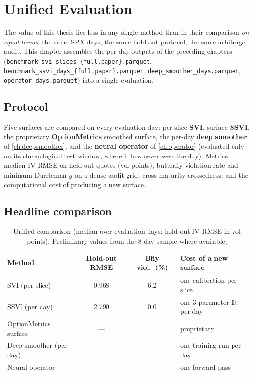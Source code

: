 \chapter{Unified Evaluation}
\label{ch:evaluation}

The value of this thesis lies less in any single method than in their
comparison \emph{on equal terms}: the same SPX days, the same hold-out
protocol, the same arbitrage audit. This chapter assembles the per-day
outputs of the preceding chapters
(\texttt{benchmark\_svi\_slices\_\{full,paper\}.parquet},
\texttt{benchmark\_ssvi\_days\_\{full,paper\}.parquet},
\texttt{deep\_smoother\_days.parquet}, \texttt{operator\_days.parquet}) into
a single evaluation.

\section{Protocol}
Five surfaces are compared on every evaluation day: per-slice \textbf{SVI},
surface \textbf{SSVI}, the proprietary \textbf{OptionMetrics} smoothed
surface, the per-day \textbf{deep smoother} of \cref{ch:deepsmoother}, and
the \textbf{neural operator} of \cref{ch:operator} (evaluated only on its
chronological test window, where it has never seen the day). Metrics:
median IV RMSE on held-out quotes (vol points); butterfly-violation rate and
minimum Durrleman $g$ on a dense audit grid; cross-maturity crossedness;
and the computational cost of producing a new surface.

\section{Headline comparison}

\begin{table}[t]
  \centering
  \caption[Unified five-method comparison]{Unified comparison (median over
  evaluation days; hold-out IV RMSE in vol points). Preliminary values from
  the 8-day sample where available; }
  \label{tab:unified}
  \begin{tabular}{lS[table-format=1.3]S[table-format=2.1]l}
    \toprule
    Method & {Hold-out RMSE} & {Bfly viol.\ (\%)} & Cost of a new surface \\
    \midrule
    SVI (per slice)        & 0.968 & 6.2 & one calibration per slice \\
    SSVI (per day)         & 2.790 & 0.0 & one 3-parameter fit per day \\
    OptionMetrics surface  & {---} & {\TODO{}} & proprietary \\
    Deep smoother (per day)& {\TODO{}} & {\TODO{}} & one training run per day \\
    Neural operator        & {\TODO{}} & {\TODO{}} & one forward pass \\
    \bottomrule
  \end{tabular}
\end{table}

